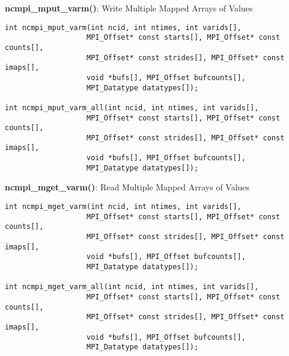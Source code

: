 {\bf ncmpi\_mput\_varm()}: Write Multiple Mapped Arrays of Values

\begin{verbatim}
int ncmpi_mput_varm(int ncid, int ntimes, int varids[],
                   MPI_Offset* const starts[], MPI_Offset* const counts[],
                   MPI_Offset* const strides[], MPI_Offset* const imaps[],
                   void *bufs[], MPI_Offset bufcounts[],
                   MPI_Datatype datatypes[]);

int ncmpi_mput_varm_all(int ncid, int ntimes, int varids[],
                   MPI_Offset* const starts[], MPI_Offset* const counts[],
                   MPI_Offset* const strides[], MPI_Offset* const imaps[],
                   void *bufs[], MPI_Offset bufcounts[],
                   MPI_Datatype datatypes[]);
\end{verbatim}


{\bf ncmpi\_mget\_varm()}: Read Multiple Mapped Arrays of Values

\begin{verbatim}
int ncmpi_mget_varm(int ncid, int ntimes, int varids[],
                   MPI_Offset* const starts[], MPI_Offset* const counts[],
                   MPI_Offset* const strides[], MPI_Offset* const imaps[],
                   void *bufs[], MPI_Offset bufcounts[],
                   MPI_Datatype datatypes[]);

int ncmpi_mget_varm_all(int ncid, int ntimes, int varids[],
                   MPI_Offset* const starts[], MPI_Offset* const counts[],
                   MPI_Offset* const strides[], MPI_Offset* const imaps[],
                   void *bufs[], MPI_Offset bufcounts[],
                   MPI_Datatype datatypes[]);
\end{verbatim}
